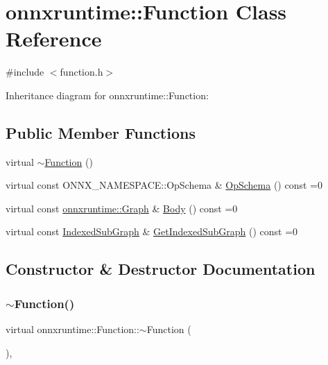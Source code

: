 \hypertarget{classonnxruntime_1_1Function}{}\section{onnxruntime\+:\+:Function Class Reference}
\label{classonnxruntime_1_1Function}


{\ttfamily \#include $<$function.\+h$>$}



Inheritance diagram for onnxruntime\+:\+:Function\+:
\subsection*{Public Member Functions}
\begin{DoxyCompactItemize}
\item 
virtual \mbox{\hyperlink{classonnxruntime_1_1Function_a53fa3b8484424aaeadf593d248be1dcf}{$\sim$\+Function}} ()
\item 
virtual const O\+N\+N\+X\+\_\+\+N\+A\+M\+E\+S\+P\+A\+C\+E\+::\+Op\+Schema \& \mbox{\hyperlink{classonnxruntime_1_1Function_aad1b1f67422088275cb4ce6470aa906a}{Op\+Schema}} () const =0
\item 
virtual const \mbox{\hyperlink{classonnxruntime_1_1Graph}{onnxruntime\+::\+Graph}} \& \mbox{\hyperlink{classonnxruntime_1_1Function_a08b5712ccba430871c186da1c8670257}{Body}} () const =0
\item 
virtual const \mbox{\hyperlink{structonnxruntime_1_1IndexedSubGraph}{Indexed\+Sub\+Graph}} \& \mbox{\hyperlink{classonnxruntime_1_1Function_a017f5155e74c32b1e3cd42e6c0f94d91}{Get\+Indexed\+Sub\+Graph}} () const =0
\end{DoxyCompactItemize}


\subsection{Constructor \& Destructor Documentation}
\mbox{\label{classonnxruntime_1_1Function_a53fa3b8484424aaeadf593d248be1dcf}} 
\subsubsection{\texorpdfstring{$\sim$\+Function()}{~Function()}}
{\footnotesize\ttfamily virtual onnxruntime\+::\+Function\+::$\sim$\+Function (\begin{DoxyParamCaption}{ }\end{DoxyParamCaption})\hspace{0.3cm}{\ttfamily [inline]}, {\ttfamily [virtual]}}



